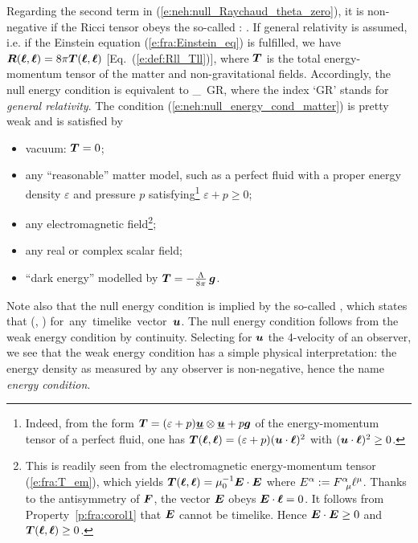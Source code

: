 Regarding the second term in (\ref{e:neh:null_Raychaud_theta_zero}),
it is non-negative if the Ricci tensor obeys the so-called
:
\be \label{e:neh:null_energy_cond}
    .
\ee
If general relativity is assumed, i.e. if the Einstein equation
(\ref{e:fra:Einstein_eq}) is fulfilled, we have
$\bm{R}(\bm{\ell}, \bm{\ell}) = 8\pi \bm{T}(\bm{\ell},\bm{\ell})$ [Eq.~(\ref{e:def:Rll_Tll})],
where $\bm{T}$ is the total energy-momentum tensor of the matter and
non-gravitational fields. Accordingly, the null energy condition
is equivalent to
\be \label{e:neh:null_energy_cond_matter}
    _{\rm\,  GR},
\ee
where the index `GR' stands for \emph{general relativity}.
The condition (\ref{e:neh:null_energy_cond_matter}) is pretty weak and is satisfied by
\begin{itemize}
\item vacuum: $\bm{T}=0$;
\item any ``reasonable'' matter model, such as a perfect fluid with a
proper energy density $\varepsilon$ and pressure $p$ satisfying\footnote{Indeed, from the form $\bm{T} = (\varepsilon+p)\underline{\bm{u}}\otimes\underline{\bm{u}} + p \bm{g}$
of the energy-momentum tensor of a perfect fluid, one has
$\bm{T}(\bm{\ell},\bm{\ell}) = (\varepsilon+p)(\bm{u}\cdot\bm{\ell})^2$ with $(\bm{u}\cdot\bm{\ell})^2\geq 0$.}
$\varepsilon+p\geq 0$;
\item any electromagnetic field\footnote{This is readily seen from the electromagnetic
energy-momentum tensor (\ref{e:fra:T_em}), which yields $\bm{T}(\bm{\ell},\bm{\ell}) = \mu_0^{-1} \bm{E}\cdot\bm{E}$ where $E^\alpha := F^\alpha_{\ \, \mu} \ell^\mu$. Thanks to the antisymmetry
of $\bm{F}$, the vector $\bm{E}$ obeys $\bm{E}\cdot\bm{\ell} = 0$. It follows from
Property~\ref{p:fra:corol1} that $\bm{E}$ cannot be timelike. Hence
$\bm{E}\cdot\bm{E}\geq 0$ and $\bm{T}(\bm{\ell},\bm{\ell})\geq 0$.};
\item any real or complex scalar field;
\item ``dark energy'' modelled by $\bm{T} = -\frac{\Lambda}{8\pi}\, \bm{g}$.
\end{itemize}
Note also that the null energy condition is implied by the
so-called ,
which states that
\be
    (, )  \quad \mbox{for any timelike vector $\w{u}$}.
\ee
The null energy condition follows from the
weak energy condition by continuity.
Selecting for $\bm{u}$ the 4-velocity of an observer, we see that
the weak energy condition has a simple physical interpretation: the energy
density as measured by any observer is non-negative,
hence the name \emph{energy condition}.

